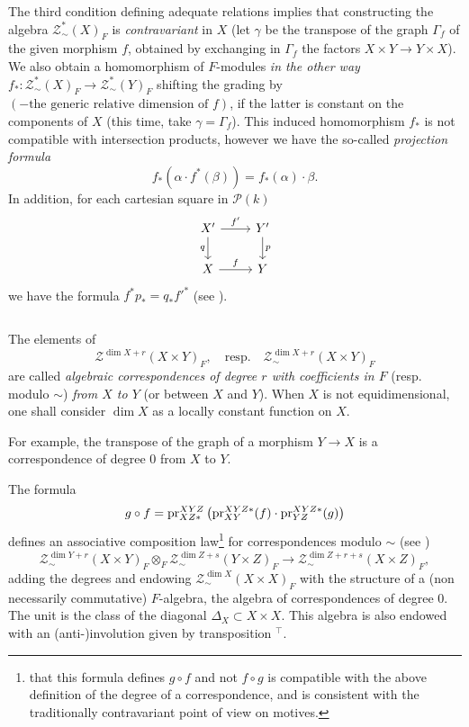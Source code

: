 \documentclass[../main.tex]{subfiles}
\begin{document}
The third condition defining adequate relations implies that constructing the algebra $\mathcal{Z}^*_{\sim}(X)_F$ is \emph{contravariant} in $X$ (let $\gamma$ be the transpose of the graph $\Gamma_f$ of the given morphism $f$, obtained by exchanging in $\Gamma_f$ the factors $X \times Y \to Y \times X$).
We also obtain a homomorphism of $F$-modules \emph{in the other way} $f_* : \mathcal{Z}^*_{\sim}(X)_F \to \mathcal{Z}^*_{\sim}(Y)_F$ shifting the grading by $(- \text{the generic relative dimension of }f)$, if the latter is constant on the components of $X$ (this time, take $\gamma = \Gamma_f$).
This induced homomorphism $f_*$ is not compatible with intersection products, however we have the so-called \emph{projection formula}
$$f_*(\alpha \cdot f^*(\beta)) = f_*(\alpha) \cdot \beta.$$
In addition, for each cartesian square in $\mathcal{P}(k)$
\[\begin{tikzcd}
	{X'} & {Y'} \\
	X & Y
	\arrow["{f'}", from=1-1, to=1-2]
	\arrow["q"', from=1-1, to=2-1]
	\arrow["p", from=1-2, to=2-2]
	\arrow["f", from=2-1, to=2-2]
\end{tikzcd}\]
we have the formula $f^*p_* = q_*f'^*$ (see \cite{fu84}).

\subsection{} The elements of
$$\mathcal{Z}^{\dim X + r}(X \times Y)_F,\quad\text{resp.}\quad \mathcal{Z}_{\sim}^{\dim X + r}(X \times Y)_F$$
are called \emph{algebraic correspondences of degree $r$ with coefficients in $F$} (resp. modulo $\sim$) \emph{from $X$ to $Y$} (or between $X$ and $Y$). When $X$ is not equidimensional, one shall consider $\dim X$ as a locally constant function on $X$.

For example, the transpose of the graph of a morphism $Y \to X$ is a correspondence of degree $0$ from $X$ to $Y$.

The formula
$$g \circ f = \mathrm{pr}^{XYZ}_{XZ*} \left(\mathrm{pr}^{XYZ*}_{XY}(f) \cdot \mathrm{pr}^{XYZ*}_{YZ}(g)\right)$$
defines an associative composition law\footnote{that this formula defines $g \circ f$ and not $f \circ g$ is compatible with the above definition of the degree of a correspondence, and is consistent with the traditionally contravariant point of view on motives.} for correspondences modulo $\sim$ (see \cite{fu84})
$$\mathcal{Z}^{\dim Y + r}_{\sim}(X \times Y)_F \otimes_F \mathcal{Z}^{\dim Z + s}_{\sim}(Y \times Z)_F \to \mathcal{Z}^{\dim Z + r + s}_{\sim}(X \times Z)_F,$$
adding the degrees and endowing $\mathcal{Z}^{\dim X}_{\sim}(X \times X)_F$ with the structure of a (non necessarily commutative) $F$-algebra, the algebra of correspondences of degree $0$.
The unit is the class of the diagonal $\Delta_X \subset X \times X$.
This algebra is also endowed with an (anti-)involution given by transposition $^{\top}$.
\end{document}
